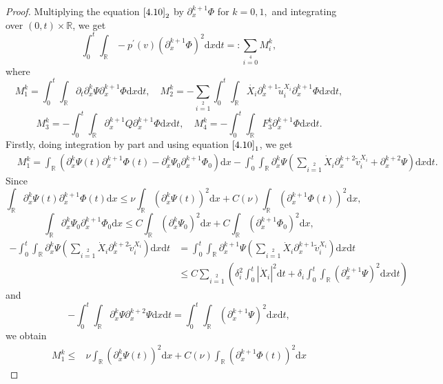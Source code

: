 \documentclass[10pt,reqno]{amsart}
\numberwithin{equation}{section}
\newcommand{\dif}{\mathrm{d}}
\begin{document}
\begin{proof}
Multiplying the equation $\eqref{4.10}_2$ by $\partial_{x}^{k+1}\Phi$ for $k=0 , 1,$ and integrating over $(0,t)\times \mathbb{R}$, we get
\[
\int_0^t\int_{\mathbb{R}}-p^{\prime}(v)\left(\partial_{x}^{k+1}\Phi\right)^2\dif x \dif t=:\sum\limits_{i=0}\limits^{4}M_i^k,
\]
where
\[
M_1^k=\int_0^t\int_\mathbb{R}\partial_{t}\partial_{x}^k\Psi\partial_{x}^{k+1}\Phi \dif x \dif t,
\quad M_2^k=-\sum\limits_{i=1}\limits^2\int_0^t\int_\mathbb{R}\dot{X_i}\partial_{x}^{k+1}\widetilde{u}_i^{X_i}
\partial_{x}^{k+1}\Phi \dif x \dif t,
\]
\[
M_3^k=-\int_0^t\int_\mathbb{R}\partial_{x}^{k+1}Q\partial_{x}^{k+1}\Phi \dif x \dif t,
\quad M_4^k=-\int_0^t\int_\mathbb{R}F_3^k\partial_{x}^{k+1}\Phi \dif x \dif t.
\]
Firstly, doing integration by part and using equation $\eqref{4.10}_1$, we get
\begin{align*}
&M_1^k=\int_\mathbb{R}\left(\partial_{x}^k\Psi(t)\partial_{x}^{k+1}\Phi(t) -\partial_{x}^k\Psi_0\partial_{x}^{k+1}\Phi_0 \right)\dif x
-\int_0^t\int_\mathbb{R}\partial_{x}^k\Psi
      \left(\sum\limits_{i=1}\limits^2\dot{X}_i\partial_{x}^{k+2}\widetilde{v}_i^{X_i}
      +\partial_{x}^{k+2}\Psi
      \right)\dif x \dif t.
\end{align*}
Since
\[
	\int_\mathbb{R}\partial_{x}^k\Psi(t)\partial_{x}^{k+1}\Phi(t) \dif x\leq \nu\int_\mathbb{R}(\partial_{x}^k\Psi(t))^2 \dif x +C(\nu)\int_\mathbb{R}(\partial_{x}^{k+1}\Phi(t))^2 \dif x,
	\]
		\[
	\int_\mathbb{R}\partial_{x}^k\Psi_0\partial_{x}^{k+1}\Phi_0 \dif x\leq C\int_\mathbb{R}(\partial_{x}^k\Psi_0)^2 \dif x +C\int_\mathbb{R}(\partial_{x}^{k+1}\Phi_0)^2 \dif x,
	\]
\begin{align*}
-\int_0^t\int_\mathbb{R}\partial_{x}^k\Psi
      \left(\sum\limits_{i=1}\limits^2\dot{X}_i\partial_{x}^{k+2}\widetilde{v}_i^{X_i}\right)\dif x \dif t
&=\int_0^t\int_\mathbb{R}\partial_{x}^{k+1}\Psi
      \left(\sum\limits_{i=1}\limits^2\dot{X}_i\partial_{x}^{k+1}\widetilde{v}_i^{X_i}\right)\dif x \dif t\\
&\le C\sum\limits_{i=1}\limits^2\left(\delta_i^2\int_0^t|\dot{X}_i|^2\dif t
+\delta_i\int_0^t\int_\mathbb{R}(\partial_{x}^{k+1}\Psi)^2 \dif x\dif t\right)
\end{align*}
and
\[
-\int_0^t\int_\mathbb{R}\partial_{x}^k\Psi\partial_{x}^{k+2}\Psi\dif x \dif t
=\int_0^t\int_\mathbb{R}\left(\partial_{x}^{k+1}\Psi\right)^2\dif x \dif t,
\]
we obtain
\begin{align*}
M_1^k\leq&\nu\int_\mathbb{R}\left(\partial_{x}^k\Psi(t)\right)^2\dif x
+C(\nu)\int_\mathbb{R}\left(\partial_{x}^{k+1}\Phi(t)\right)^2\dif x

\end{align*}
\end{proof}
\end{document}
